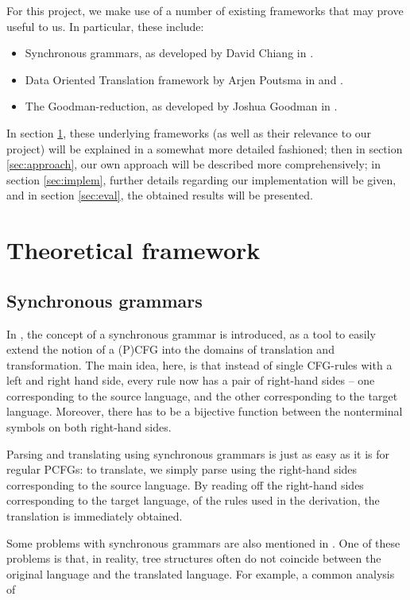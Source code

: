 \documentclass[a4paper]{article}
\theoremstyle{definition}
\begin{document}
{{For this project, we make use of a number of existing frameworks that may prove
useful to us. In particular, these include:

\begin{itemize}
\item Synchronous grammars, as developed by David Chiang in \cite{Ch}.
\item Data Oriented Translation framework by Arjen Poutsma in \cite{Po} and
	\cite{Po2}.
\item The Goodman-reduction, as developed by Joshua Goodman in \cite{Go}.
\end{itemize}

In section \ref{sec:theor}, these underlying frameworks (as well as their
relevance to our project) will be explained in a somewhat more detailed
fashioned; then in section \ref{sec:approach}, our own approach will be described more
comprehensively; in section \ref{sec:implem}, further details regarding our implementation
will be given, and in section \ref{sec:eval}, the obtained results will be presented.

\section{Theoretical framework}
\label{sec:theor}

\subsection{Synchronous grammars}

In \cite{Ch}, the concept of a synchronous grammar is introduced, as a tool to
easily extend the notion of a (P)CFG into the domains of translation and
transformation. The main idea, here, is that instead of single CFG-rules with a
left and right hand side, every rule now has a pair of right-hand sides -- one
corresponding to the source language, and the other corresponding to the target
language. Moreover, there has to be a bijective function between the
nonterminal symbols on both right-hand sides.

Parsing and translating using synchronous grammars is just as easy as it is for
regular PCFGs: to translate, we simply parse using the right-hand sides
corresponding to the source language. By reading off the right-hand sides
corresponding to the target language, of the rules used in the derivation, the
translation is immediately obtained.

Some problems with synchronous grammars are also mentioned in \cite{Ch}. One of
these problems is that, in reality, tree structures often do not coincide
between the original language and the translated language. For example, a
common analysis of 

}}
\end{document}
